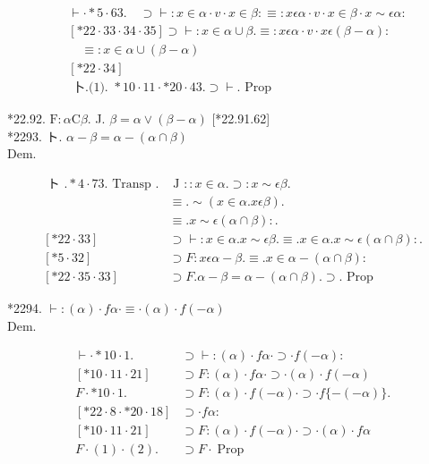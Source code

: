 \documentclass[10pt]{article}
\begin{document}
\begin{align*}
& \vdash \cdot * 5 \cdot 63 . \quad \supset \vdash: x \in \alpha \cdot v \cdot x \in \beta: \equiv: x \epsilon \alpha \cdot v \cdot x \in \beta \cdot x \sim \epsilon \alpha: \\
& {[* 22 \cdot 33 \cdot 34 \cdot 35] \supset \vdash: x \in \alpha \cup \beta . \equiv: x \epsilon \alpha \cdot v \cdot x \epsilon(\beta-\alpha):} \\
& \quad \equiv: x \in \alpha \cup(\beta-\alpha)  \tag{1}\\
& {[* 22 \cdot 34]} \\
& \text { 卜.(1). } * 10 \cdot 11 \cdot * 20 \cdot 43 . \supset \vdash . \text { Prop }
\end{align*}


*22.92. $\mathrm{F}: \alpha \mathrm{C} \beta$. J. $\beta=\alpha \vee(\beta-\alpha)$ [*22.91.62]\\
*2293. ト. $\alpha-\beta=\alpha-(\alpha \cap \beta)$\\
Dem.

$$
\begin{array}{lr}
\text { ト } . * 4 \cdot 73 . \text { Transp } . & \text { J }:: x \in \alpha . \supset: x \sim \epsilon \beta . \\
& \equiv . \sim(x \in \alpha . x \epsilon \beta) . \\
& \equiv . x \sim \epsilon(\alpha \cap \beta): . \\
{[* 22 \cdot 33]} & \supset \vdash: x \in \alpha . x \sim \epsilon \beta . \equiv . x \in \alpha . x \sim \epsilon(\alpha \cap \beta): . \\
{[* 5 \cdot 32]} & \supset F: x \epsilon \alpha-\beta . \equiv . x \in \alpha-(\alpha \cap \beta): \\
{[* 22 \cdot 35 \cdot 33]} & \supset F . \alpha-\beta=\alpha-(\alpha \cap \beta) . \supset \text {. Prop }
\end{array}
$$

*2294. $\vdash:(\alpha) \cdot f \alpha \cdot \equiv \cdot(\alpha) \cdot f(-\alpha)$\\
Dem.

\[
\begin{array}{ll}
\vdash \cdot * 10 \cdot 1 . & \supset \vdash:(\alpha) \cdot f \alpha \cdot \supset \cdot f(-\alpha): \\
{[* 10 \cdot 11 \cdot 21]} & \supset F:(\alpha) \cdot f \alpha \cdot \supset \cdot(\alpha) \cdot f(-\alpha) \\
F \cdot * 10 \cdot 1 . & \supset F:(\alpha) \cdot f(-\alpha) \cdot \supset \cdot f\{-(-\alpha)\} . \\
{[* 22 \cdot 8 \cdot * 20 \cdot 18]} & \supset \cdot f \alpha: \\
{[* 10 \cdot 11 \cdot 21]} & \supset F:(\alpha) \cdot f(-\alpha) \cdot \supset \cdot(\alpha) \cdot f \alpha  \tag{2}\\
F \cdot(1) \cdot(2) . & \supset F \cdot \operatorname{Prop}
\end{array}
\]
\end{document}
